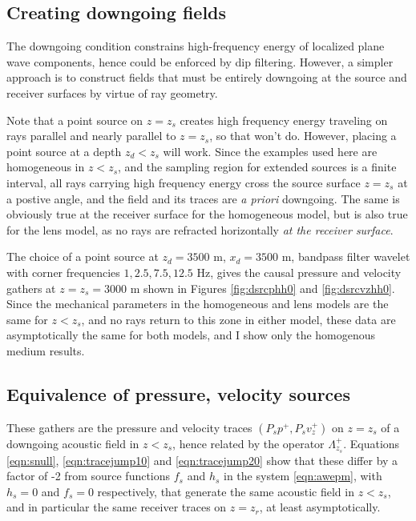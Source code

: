 
\subsection{Creating downgoing fields}
The downgoing condition constrains high-frequency energy of localized
plane wave components, hence could be enforced by dip
filtering. However, a simpler approach is to construct fields that
must be entirely downgoing at the source and receiver surfaces by
virtue of ray geometry.

Note that a point source
on $z=z_s$ creates high frequency energy traveling on rays parallel
and nearly parallel to $z=z_s$, so that won't do. However, placing a
point source at a depth $z_d<z_s$ will work. Since the examples used here are
homogeneous in $z<z_s$, and the sampling region for extended sources
is a finite interval, all rays carrying high frequency energy cross
the source surface $z=z_s$ at a postive angle, and the field and its
traces are {\em a priori} downgoing. The same is obviously true at the
receiver surface for the homogeneous model, but is also true for the
lens model, as no rays are refracted horizontally {\em at the receiver surface}.

The choice of a point source at
$z_d=3500$ m, $x_d=3500$ m,  bandpass filter wavelet with
corner frequencies $1, 2.5, 7.5, 12.5$ Hz, gives the causal pressure and
velocity gathers at $z=z_s=3000$ m
shown in Figures \ref{fig:dsrcphh0} and \ref{fig:dsrcvzhh0}.  Since the
mechanical parameters in the homogeneous and lens models are the same
for $z<z_s$, and no rays return to this zone in either model, these
data are asymptotically the same for both models, and I show only the
homogenous medium results.

\subsection{Equivalence of pressure, velocity sources}
These gathers are the pressure and
velocity traces
$(P_sp^+,P_sv^+_z)$ on $z=z_s$ of a downgoing acoustic field in
$z<z_s$, hence related by the operator $\Lambda^+_{z_s}$.
Equations \ref{eqn:snull}, \ref{eqn:tracejump10} and
\ref{eqn:tracejump20} show that these differ by a factor of -2 from
source functions $f_s$ and $h_s$ in the system \ref{eqn:awepm},
with $h_s=0$ and $f_s=0$ respectively, that generate the same acoustic
field in $z<z_s$, and in particular the same receiver traces on
$z=z_r$, at least asymptotically.

